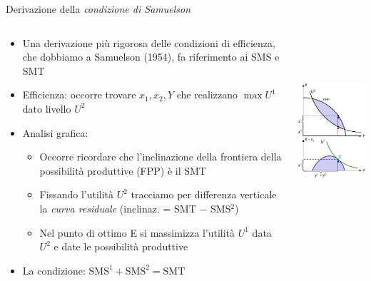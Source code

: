 \documentclass[aspectratio=64,11pt]{beamer}
\begin{document}
\begin{frame}{Derivazione della \emph{condizione di Samuelson}}
\begin{columns}
\begin{column}{.5\columnwidth}
\small
\begin{itemize}
\item Una derivazione più rigorosa delle condizioni di efficienza, che dobbiamo a
Samuelson (1954),  fa riferimento ai SMS e SMT
\item Efficienza: occorre trovare $x_{1},x_{2},Y$ che realizzano $\max U^{1}$
dato livello $U^{2}$
\item Analisi grafica:
\begin{itemize}
\item Occorre ricordare che l'inclinazione della frontiera della possibilità
produttive (FPP) è il SMT
\item Fissando l'utilità $U^{2}$ tracciamo per differenza verticale la \emph{curva
residuale} (inclinaz. = SMT $-$ SMS$^2$)
\item Nel punto di ottimo E si massimizza l'utilità $U^{1}$ data $U^{2}$ e date
le possibilità produttive
\end{itemize}
\item La condizione: $\text{SMS}^{1}+\text{SMS}^{2}=\text{SMT}$
\end{itemize}
\end{column}

\begin{column}{.5\columnwidth}
\begin{center}
\includegraphics[height=7cm]{./figure/samuelson-11.pdf}
\end{center} 
\end{column}
\end{columns}
\end{frame}
\end{document}
